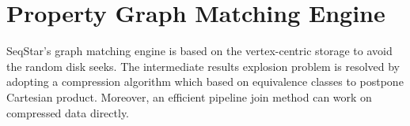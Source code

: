 \section{Property Graph Matching Engine}\label{sec:match}


SeqStar's graph matching engine is based on the vertex-centric storage to avoid the random disk seeks.
The intermediate results explosion problem is resolved by adopting a compression algorithm which based on equivalence classes to postpone Cartesian product.
Moreover, an efficient pipeline join method can work on compressed data directly.




